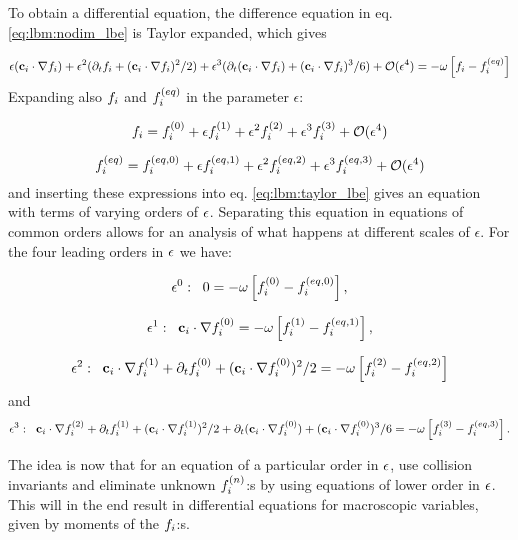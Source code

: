 To obtain a differential equation, the difference equation in
eq. \eqref{eq:lbm:nodim_lbe} is Taylor expanded, which gives

\begin{equation}\label{eq:lbm:taylor_lbe}
\epsilon(\mathbf{c}_i\cdot\nabla f_i) + \epsilon^2 (\partial_tf_i + (\mathbf{c}_i\cdot\nabla f_i)^2/2 ) + \epsilon^3
(\partial_t (\mathbf{c}_i\cdot\nabla f_i) + (\mathbf{c}_i\cdot\nabla f_i)^3/6) + \mathcal{O}(\epsilon^4) = 
-\omega \left[
  f_i - f_i^{(eq)} \right]
\end{equation}
Expanding also $f_i$ and $f_i^{(eq)}$ in the parameter $\epsilon$:

\begin{equation}\label{eq:lbm:fi_exp}
f_i = f_i^{(0)} + \epsilon f_i^{(1)} + \epsilon^2f_i^{(2)} + \epsilon^3f_i^{(3)} + \mathcal{O}(\epsilon^4)
\end{equation}

\begin{equation}\label{eq:lbm:fi_eq_exp}
f_i^{(eq)} = f_i^{(eq, 0)} + \epsilon f_i^{(eq, 1)} + \epsilon^2f_i^{(eq, 2)} + \epsilon^3f_i^{(eq, 3)} +
\mathcal{O}(\epsilon^4)
\end{equation}
and inserting these expressions into eq. \eqref{eq:lbm:taylor_lbe}
gives an equation with terms of varying orders of $\epsilon$. Separating
this equation in equations of common orders allows for an analysis of
what happens at different scales of $\epsilon$. For the four leading
orders in $\epsilon$ we have:

\begin{equation}\label{eq:lbm:ep0}
\epsilon^0:\;\; 0 = -\omega \left[
  f_i^{(0)} - f_i^{(eq, 0)} \right],
\end{equation}

\begin{equation}\label{eq:lbm:ep1}
\epsilon^1:\;\; \mathbf{c}_i\cdot\nabla f_i^{(0)} = -\omega \left[
  f_i^{(1)} - f_i^{(eq, 1)} \right],
\end{equation}

\begin{equation}\label{eq:lbm:ep2}
\epsilon^2:\;\; \mathbf{c}_i\cdot\nabla f_i^{(1)} + \partial_tf_i^{(0)} + (\mathbf{c}_i\cdot\nabla f_i^{(0)})^2/2 =
-\omega \left[ f_i^{(2)} - f_i^{(eq, 2)} \right]
\end{equation}
and
\begin{equation}\label{eq:lbm:ep3}
\epsilon^3:\;\; \mathbf{c}_i\cdot\nabla f_i^{(2)} + \partial_tf_i^{(1)} + (\mathbf{c}_i\cdot\nabla f_i^{(1)})^2/2 +
\partial_t (\mathbf{c}_i\cdot\nabla f_i^{(0)}) + (\mathbf{c}_i\cdot\nabla f_i^{(0)})^3/6 = -\omega \left[ f_i^{(3)} -
  f_i^{(eq, 3)} \right].
\end{equation}

The idea is now that for an equation of a particular order in $\epsilon$,
use collision invariants and eliminate unknown $f_i^{(n)}$:s by using
equations of lower order in $\epsilon$. This will in the end result in
differential equations for macroscopic variables, given by moments of
the $f_i$:s.
